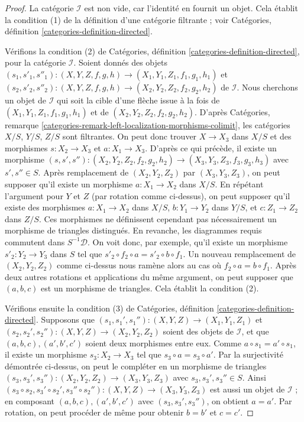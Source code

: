 \begin{proof}
\medskip\noindent
La catégorie $\mathcal{I}$ est non vide, car l'identité en fournit un objet.
Cela établit la condition (1) de la définition d'une catégorie filtrante ; voir
Catégories, définition \ref{categories-definition-directed}.

\medskip\noindent
Vérifions la condition (2) de Catégories, définition
\ref{categories-definition-directed}, pour la catégorie $\mathcal{I}$.
Soient donnés des objets
$(s_1, s'_1, s''_1) : (X, Y, Z, f, g, h) \to (X_1, Y_1, Z_1, f_1, g_1, h_1)$
et
$(s_2, s'_2, s''_2) : (X, Y, Z, f, g, h) \to (X_2, Y_2, Z_2, f_2, g_2, h_2)$
de $\mathcal{I}$. Nous cherchons un objet de $\mathcal{I}$ qui soit la cible
d'une flèche issue à la fois de $(X_1, Y_1, Z_1, f_1, g_1, h_1)$ et de
$(X_2, Y_2, Z_2, f_2, g_2, h_2)$. D'après Catégories, remarque
\ref{categories-remark-left-localization-morphisms-colimit}, les catégories
$X/S$, $Y/S$, $Z/S$ sont filtrantes.
On peut donc trouver $X \to X_3$ dans $X/S$ et des morphismes
$s : X_2 \to X_3$ et $a : X_1 \to X_3$. D'après ce qui précède, il existe un
morphisme
$(s, s', s'') : (X_2, Y_2, Z_2, f_2, g_2, h_2) \to
(X_3, Y_3, Z_3, f_3, g_3, h_3)$ avec $s', s'' \in S$.
Après remplacement de $(X_2, Y_2, Z_2)$ par $(X_3, Y_3, Z_3)$, on peut supposer
qu'il existe un morphisme $a : X_1 \to X_2$ dans $X/S$.
En répétant l'argument pour $Y$ et $Z$ (par rotation comme ci-dessus), on peut
supposer qu'il existe des morphismes
$a : X_1 \to X_2$ dans $X/S$,
$b : Y_1 \to Y_2$ dans $Y/S$, et
$c : Z_1 \to Z_2$ dans $Z/S$.
Ces morphismes ne définissent cependant pas nécessairement un morphisme de
triangles distingués. En revanche, les diagrammes requis commutent dans
$S^{-1}\mathcal{D}$. On voit donc, par exemple, qu'il existe un morphisme
$s'_2 : Y_2 \to Y_3$ dans $S$ tel que
$s'_2 \circ f_2 \circ a = s'_2 \circ b \circ f_1$.
Un nouveau remplacement de $(X_2, Y_2, Z_2)$ comme ci-dessus nous ramène alors
au cas où $f_2 \circ a = b \circ f_1$. Après deux autres rotations et
applications du même argument, on peut supposer que $(a, b, c)$ est un
morphisme de triangles. Cela établit la condition (2).

\medskip\noindent
Vérifions ensuite la condition (3) de Catégories, définition
\ref{categories-definition-directed}.
Supposons que
$(s_1, s_1', s_1'') : (X, Y, Z) \to (X_1, Y_1, Z_1)$ et
$(s_2, s_2', s_2'') : (X, Y, Z) \to (X_2, Y_2, Z_2)$
soient des objets de $\mathcal{I}$, et que $(a, b, c), (a', b', c')$ soient
deux morphismes entre eux. Comme $a \circ s_1 = a' \circ s_1$, il existe un
morphisme $s_3 : X_2 \to X_3$ tel que $s_3 \circ a = s_3 \circ a'$.
Par la surjectivité démontrée ci-dessus, on peut le compléter en un morphisme de
triangles
$(s_3, s_3', s_3'') : (X_2, Y_2, Z_2) \to (X_3, Y_3, Z_3)$
avec $s_3, s_3', s_3'' \in S$. Ainsi
$(s_3 \circ s_2, s_3' \circ s_2', s_3'' \circ s_2'') :
(X, Y, Z) \to (X_3, Y_3, Z_3)$ est aussi un objet de $\mathcal{I}$ ; en
composant $(a, b, c), (a', b', c')$ avec $(s_3, s_3', s_3'')$, on obtient
$a = a'$. Par rotation, on peut procéder de même pour obtenir $b = b'$ et
$c = c'$.


\end{proof}
